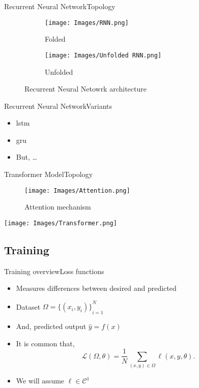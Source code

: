 \documentclass{beamer}
\newcommand{\loss}{\mathcal{L}}
\begin{document}
\begin{frame}{Recurrent Neural Network}{Topology}
  \begin{figure}
    \begin{subfigure}[t]{.2\textwidth}
      \centering
      \caption{Folded}
      \texttt{[image: Images/RNN.png]}
    \end{subfigure}\hfill
    \begin{subfigure}[t]{.8\textwidth}
      \centering
      \caption{Unfolded}
      \texttt{[image: Images/Unfolded RNN.png]}
    \end{subfigure}
    \caption{Recurrent Neural Netowrk architecture}
  \end{figure}
\end{frame}

\begin{frame}{Recurrent Neural Network}{Variants}
  \begin{itemize}
    \item \Acf{lstm}
    \item \Acf{gru}
    \item But, \ldots
  \end{itemize}
\end{frame}

\begin{frame}{Transformer Model}{Topology}
  \begin{figure}
    \texttt{[image: Images/Attention.png]}
    \caption{Attention mechanism}
  \end{figure}
\end{frame}

\begin{frame}[plain]
  \centering
  \texttt{[image: Images/Transformer.png]}
\end{frame}


\subsection{Training}

\begin{frame}{Training overview}{Loss functions}
  \begin{itemize}
    \item Measures differences between desired and predicted
    \item Dataset \(\Omega = {\{(x_i, y_i)\}}_{i=1}^N\)
    \item And, predicted output \(\hat{y} = f(x)\)
    \item It is common that,
    \begin{equation}
      \loss(\Omega, \theta) =
      \frac{1}{N} \sum_{(x, y) \in \Omega} \ell (x, y, \theta).
    \end{equation}
    \item We will assume \(\ell \in \mathcal{C}^1\)
  \end{itemize}
\end{frame}
\end{document}
